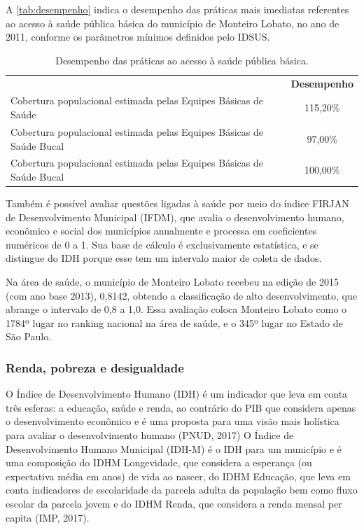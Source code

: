 A \autoref{tab:desempenho} indica o desempenho das práticas mais imediatas referentes ao acesso à saúde pública básica do município de Monteiro Lobato, no ano de 2011, conforme os parâmetros mínimos definidos pelo IDSUS.

\begin{table}[htbp]
	\centering
	\caption{Desempenho das práticas ao acesso à saúde pública básica.}
	\begin{tabular}{p{28.645em}|c}
		\rowcolor[rgb]{ .969,  .588,  .275} \multicolumn{1}{c}{\textcolor[rgb]{ 1,  1,  1}{\textbf{Aspecto}}} & \textcolor[rgb]{ 1,  1,  1}{\textbf{Desempenho}} \\
		\rowcolor[rgb]{ .992,  .914,  .851} Cobertura populacional estimada pelas Equipes Básicas de Saúde & 115,20\% \\
		\rowcolor[rgb]{ .984,  .831,  .706} Cobertura populacional estimada pelas Equipes Básicas de Saúde Bucal & 97,00\% \\
		\rowcolor[rgb]{ .992,  .914,  .851} Cobertura populacional estimada pelas Equipes Básicas de Saúde Bucal & 100,00\% \\
	\end{tabular}%
	\label{tab:desempenho}%
\end{table}%

Também é possível avaliar questões ligadas à saúde por meio do índice FIRJAN de Desenvolvimento Municipal (IFDM), que avalia o desenvolvimento humano, econômico e social dos municípios anualmente e processa em coeficientes numéricos de 0 a 1. Sua base de cálculo é exclusivamente estatística, e se distingue do IDH porque esse tem um intervalo maior de coleta de dados. 		

Na área de saúde, o município de Monteiro Lobato recebeu na edição de 2015 (com ano base 2013), 0,8142, obtendo a classificação de alto desenvolvimento, que abrange o intervalo de 0,8 a 1,0. Essa avaliação coloca Monteiro Lobato como o 1784º lugar no ranking nacional na área de saúde, e o 345º lugar no Estado de São Paulo.

\subsubsection{Renda, pobreza e desigualdade}

O Índice de Desenvolvimento Humano (IDH) é um indicador que leva em conta três esferas: a educação, saúde e renda, ao contrário do PIB que considera apenas o desenvolvimento econômico e é uma proposta para uma visão mais holística para avaliar o desenvolvimento humano (PNUD, 2017) O Índice de Desenvolvimento Humano Municipal (IDH-M) é o IDH para um município e é uma composição do IDHM Longevidade, que considera a esperança (ou expectativa média em anos) de vida ao nascer, do IDHM Educação, que leva em conta indicadores de escolaridade da parcela adulta da população bem como fluxo escolar da parcela jovem e do IDHM Renda, que considera a renda mensal per capita (IMP, 2017).


